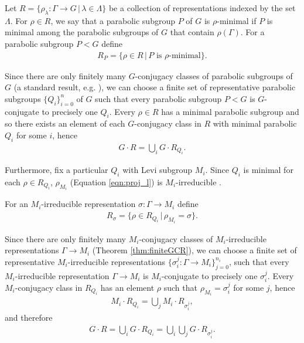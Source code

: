 Let $R = \{ \rho_\lambda : \Gamma \rightarrow G \,|\, \lambda \in \Lambda \}$ be a collection of representations indexed by the set $\Lambda$. For $\rho \in R$, we say that a parabolic subgroup $P$ of $G$ is $\rho$-minimal if $P$ is minimal among the parabolic subgroups of $G$ that contain $\rho(\Gamma)$. For a parabolic subgroup $P < G$ define
\begin{align*}
  R_P = \{ \rho \in R \,|\, P \textrm{ is } \rho\textrm{-minimal} \}.
\end{align*}

Since there are only finitely many $G$-conjugacy classes of parabolic subgroups of $G$ (a standard result, e.g. \cite[Theorem 30.1(a)]{humphreys1975linear}), we can choose a finite set of representative parabolic subgroups $\{Q_i\}_{i = 0}^n$ of $G$ such that every parabolic subgroup $P < G$ is $G$-conjugate to precisely one $Q_i$. Every $\rho \in R$ has a minimal parabolic subgroup and so there exists an element of each $G$-conjugacy class in $R$ with minimal parabolic $Q_i$ for some $i$, hence
\begin{align}
  G \cdot R = \bigcup_i G \cdot R_{Q_i}.
  \label{eqn:gr_gqi}
\end{align}

Furthermore, fix a particular $Q_i$ with Levi subgroup $M_i$. Since $Q_i$ is minimal for each $\rho \in R_{Q_i}$, $\rho_{M_i}$ (Equation \ref{eqn:proj_l}) is $M_i$-irreducible \cite[Lemma 6.2(ii)]{bate2005geometric}.

For an $M_i$-irreducible representation $\sigma : \Gamma \rightarrow M_i$ define
\begin{align*}
  R_{\sigma} = \{ \rho \in R_{Q_i} \,|\, \rho_{M_i} = \sigma \}.
\end{align*}

Since there are only finitely many $M_i$-conjugacy classes of $M_i$-irreducible representations $\Gamma \rightarrow M_i$ (Theorem \ref{thm:finiteGCR}), we can choose a finite set of representative $M_i$-irreducible representations $\{\sigma_i^j : \Gamma \rightarrow M_i \}_{j=0}^{n_i}$, such that every $M_i$-irreducible representation $\Gamma \rightarrow M_i$ is $M_i$-conjugate to precisely one $\sigma_i^j$. Every $M_i$-conjugacy class in $R_{Q_i}$ has an element $\rho$ such that $\rho_{M_i} = \sigma_i^j$ for some $j$, hence
\begin{align*}
  M_i \cdot R_{Q_i} = \bigcup_j M_i \cdot R_{\sigma_i^j},
\end{align*}
and therefore
\begin{align}
  G \cdot R = \bigcup_i G \cdot R_{Q_i} = \bigcup_i \bigcup_j G \cdot R_{\sigma_i^j}.
  \label{eqn:gr_grsigma}
\end{align}

